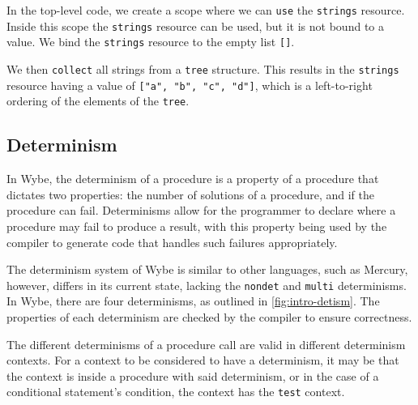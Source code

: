 In the top-level code, we create a scope where we can \texttt{use} the \texttt{strings} resource. Inside this scope the \texttt{strings} resource can be used, but it is not bound to a value. We bind the \texttt{strings} resource to the empty list \texttt{[]}.

We then \texttt{collect} all strings from a \texttt{tree} structure. This results in the \texttt{strings} resource having a value of \texttt{["a", "b", "c", "d"]}, which is a left-to-right ordering of the elements of the \texttt{tree}.

\subsection{Determinism}

In Wybe, the determinism of a procedure is a property of a procedure that dictates two properties: the number of solutions of a procedure, and if the procedure can fail. Determinisms allow for the programmer to declare where a procedure may fail to produce a result, with this property being used by the compiler to generate code that handles such failures appropriately.

The determinism system of Wybe is similar to other languages, such as Mercury, however, differs in its current state, lacking the \texttt{nondet} and \texttt{multi} determinisms. In Wybe, there are four determinisms, as outlined in \cref{fig:intro-detism}. The properties of each determinism are checked by the compiler to ensure correctness.

The different determinisms of a procedure call are valid in different determinism contexts. For a context to be considered to have a determinism, it may be that the context is inside a procedure with said determinism, or in the case of a conditional statement's condition, the context has the \texttt{test} context.

